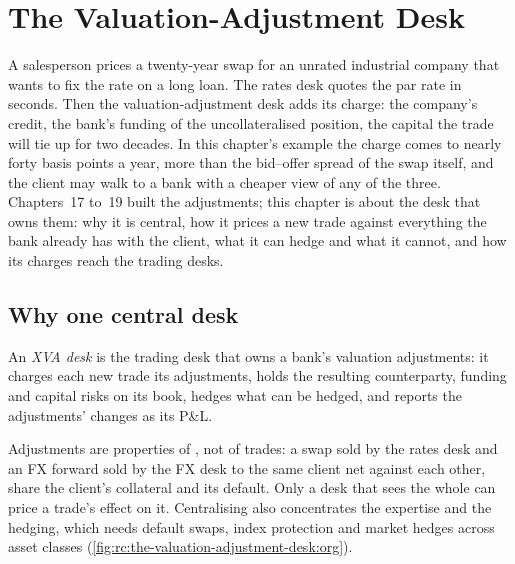 \chapter{The Valuation-Adjustment Desk}\label{ch:rc:the-valuation-adjustment-desk}

A salesperson prices a twenty-year swap for an unrated industrial company that wants to
fix the rate on a long loan. The rates desk quotes the par rate in seconds. Then the
valuation-adjustment desk adds its charge: the company's credit, the bank's funding of the
uncollateralised position, the capital the trade will tie up for two decades. In this
chapter's example the charge comes to nearly forty basis points a year, more than the
bid--offer spread of the swap itself, and the client may walk to a bank with a cheaper view
of any of the three. Chapters~17 to~19 built the adjustments; this chapter is about the desk
that owns them: why it is central, how it prices a new trade against everything the bank
already has with the client, what it can hedge and what it cannot, and how its charges reach
the trading desks.

\section{Why one central desk}

\begin{definition}\label{def:rc:the-valuation-adjustment-desk:desk}
An \emph{XVA desk} is the trading desk that owns a bank's valuation
adjustments: it charges each new trade its adjustments, holds the resulting counterparty,
funding and capital risks on its book, hedges what can be hedged, and reports the
adjustments' changes as its P\&L.
\end{definition}

Adjustments are properties of , not of trades: a swap sold by the rates desk
and an FX forward sold by the FX desk to the same client net against each other, share the
client's collateral and its default. Only a desk that sees the whole  can price a
trade's effect on it. Centralising also concentrates the expertise and the hedging, which
needs default swaps, index protection and market hedges across asset classes
(\cref{fig:rc:the-valuation-adjustment-desk:org}).

